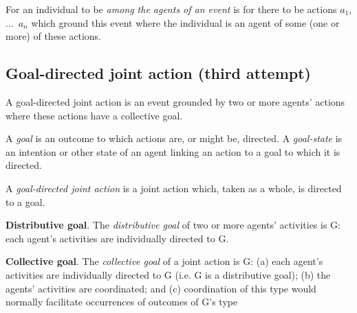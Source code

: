 \documentclass[11pt]{extarticle}
\begin{document}
\begin{multicols}{3}
For an individual to be \emph{among the agents of an event} is for there to be actions $a_1$, ...\ $a_n$ which ground this event where the individual is an agent of some (one or more) of these actions.



\subsection{Goal-directed joint action (third attempt)}

A goal-directed joint action is an event grounded by two or more agents’ actions where these actions have a collective goal.

A \emph{goal} is an outcome to which actions are, or might be, directed.  A \emph{goal-state} is an intention or other state of an agent linking an action to a goal to which it is directed.

A \emph{goal-directed joint action} is a joint action which, taken as a whole, is directed to a goal.

\textbf{Distributive goal}.  The \emph{distributive goal} of two or more agents' activities is G: each agent's activities are individually directed to G.

\textbf{Collective goal}.  The \emph{collective goal} of a joint action is G:
(a) each agent’s activities are individually directed to G (i.e. G is a distributive goal);
(b) the agents’ activities are coordinated; and 
(c) coordination of this type would normally  facilitate occurrences of outcomes of G's type




\footnotesize 


\end{multicols}
\end{document}
